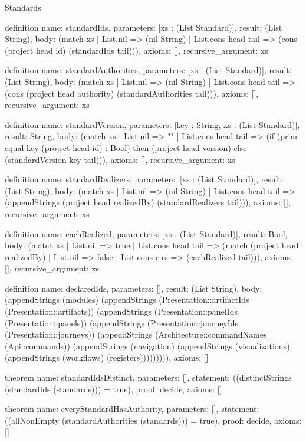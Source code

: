 \begin{lexlean}{Standards}
\begin{semanticmodule}
definition{
  name: standardIds,
  parameters: [xs : (List Standard)],
  result: (List String),
  body: (match xs
    | List.nil => (nil String)
    | List.cons head tail => (cons (project head id) (standardIds tail))),
  axioms: [],
  recursive_argument: xs
}

definition{
  name: standardAuthorities,
  parameters: [xs : (List Standard)],
  result: (List String),
  body: (match xs
    | List.nil => (nil String)
    | List.cons head tail => (cons (project head authority) (standardAuthorities tail))),
  axioms: [],
  recursive_argument: xs
}

definition{
  name: standardVersion,
  parameters: [key : String, xs : (List Standard)],
  result: String,
  body: (match xs
    | List.nil => ""
    | List.cons head tail => (if (prim equal key (project head id) : Bool) then (project head version) else (standardVersion key tail))),
  axioms: [],
  recursive_argument: xs
}

definition{
  name: standardRealizers,
  parameters: [xs : (List Standard)],
  result: (List String),
  body: (match xs
    | List.nil => (nil String)
    | List.cons head tail => (appendStrings (project head realizedBy) (standardRealizers tail))),
  axioms: [],
  recursive_argument: xs
}

definition{
  name: eachRealized,
  parameters: [xs : (List Standard)],
  result: Bool,
  body: (match xs
    | List.nil => true
    | List.cons head tail => (match (project head realizedBy)
    | List.nil => false
    | List.cons r rs => (eachRealized tail))),
  axioms: [],
  recursive_argument: xs
}

definition{
  name: declaredIds,
  parameters: [],
  result: (List String),
  body: (appendStrings (modules) (appendStrings (Presentation::artifactIds (Presentation::artifacts)) (appendStrings (Presentation::panelIds (Presentation::panels)) (appendStrings (Presentation::journeyIds (Presentation::journeys)) (appendStrings (Architecture::commandNames (Api::commands)) (appendStrings (navigation) (appendStrings (visualizations) (appendStrings (workflows) (registers))))))))),
  axioms: []
}

theorem{
  name: standardIdsDistinct,
  parameters: [],
  statement: ((distinctStrings (standardIds (standards))) = true),
  proof: decide{},
  axioms: []
}

theorem{
  name: everyStandardHasAuthority,
  parameters: [],
  statement: ((allNonEmpty (standardAuthorities (standards))) = true),
  proof: decide{},
  axioms: []
}


\end{semanticmodule}
\end{lexlean}
